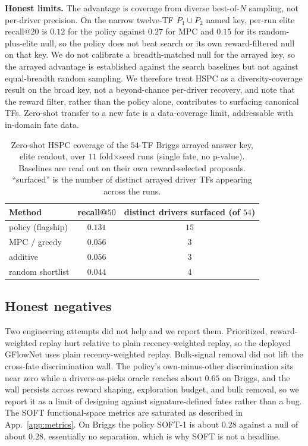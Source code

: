 \textbf{Honest limits.} The advantage is coverage from diverse best-of-$N$ sampling, not per-driver
precision. On the narrow twelve-TF $P_1{\cup}P_2$ named key, per-run elite recall@$20$ is $0.12$ for
the policy against $0.27$ for MPC and $0.15$ for its random-plus-elite null, so the policy does not
beat search or its own reward-filtered null on that key. We do not calibrate a breadth-matched null
for the arrayed key, so the arrayed advantage is established against the search baselines but not
against equal-breadth random sampling. We therefore treat HSPC as a diversity-coverage result on the
broad key, not a beyond-chance per-driver recovery, and note that the reward filter, rather than the
policy alone, contributes to surfacing canonical TFs. Zero-shot transfer to a new fate is a
data-coverage limit, addressable with in-domain fate data.

\begin{table}[h]\centering\footnotesize
\caption{Zero-shot HSPC coverage of the $54$-TF Briggs arrayed answer key, elite readout, over $11$
fold$\times$seed runs (single fate, no p-value). Baselines are read out on their own reward-selected
proposals. ``surfaced'' is the number of distinct arrayed driver TFs appearing across the runs.}
\label{tab:hspc}
\begin{tabular}{@{}lcc@{}}
\toprule
Method & recall@$50$ & distinct drivers surfaced (of $54$) \\
\midrule
policy (flagship)        & $0.131$ & $15$ \\
MPC / greedy             & $0.056$ & $3$ \\
additive                 & $0.056$ & $3$ \\
random shortlist         & $0.044$ & $4$ \\
\bottomrule
\end{tabular}
\end{table}

\subsection{Honest negatives}
Two engineering attempts did not help and we report them. Prioritized, reward-weighted replay
hurt relative to plain recency-weighted replay, so the deployed GFlowNet uses plain
recency-weighted replay. Bulk-signal removal did not lift the cross-fate discrimination wall.
The policy's own-minus-other discrimination sits near zero while a drivers-as-picks oracle
reaches about $0.65$ on Briggs, and the wall persists across reward shaping, exploration
budget, and bulk removal, so we report it as a limit of designing against signature-defined
fates rather than a bug. The SOFT functional-space metrics are saturated as described in
App.~\ref{app:metrics}. On Briggs the policy SOFT-1 is about $0.28$ against a null of about
$0.28$, essentially no separation, which is why SOFT is not a headline.

